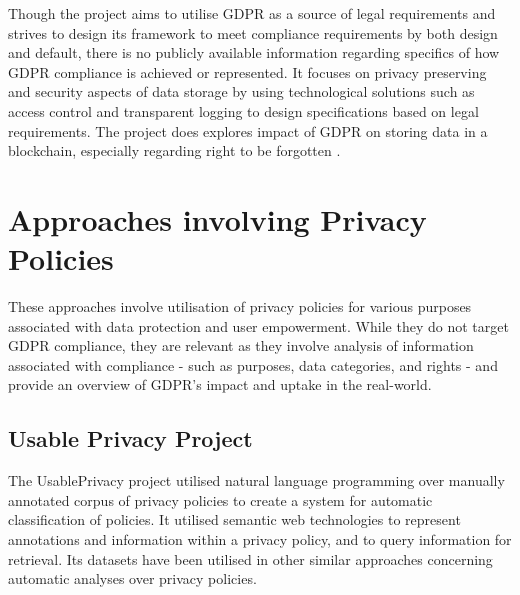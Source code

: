 Though the project aims to utilise GDPR as a source of legal requirements and strives to design its framework to meet compliance requirements by both design and default, there is no publicly available information regarding specifics of how GDPR compliance is achieved or represented.
It focuses on privacy preserving and security aspects of data storage by using technological solutions such as access control and transparent logging to design specifications based on legal requirements.
The project does explores impact of GDPR on storing data in a blockchain, especially regarding right to be forgotten \cite{bayle_when_2018}.

\section{Approaches involving Privacy Policies}\label{sec:sota:privacy-policies}
These approaches involve utilisation of privacy policies for various purposes associated with data protection and user empowerment. While they do not target GDPR compliance, they are relevant as they involve analysis of information associated with compliance - such as purposes, data categories, and rights - and provide an overview of GDPR's impact and uptake in the real-world.

\subsection*{Usable Privacy Project}
The UsablePrivacy project \cite{sadeh_usable_2013} utilised natural language programming over manually annotated corpus of privacy policies to create a system for automatic classification of policies. 
It utilised semantic web technologies \cite{oltramari_privonto_2018} to represent annotations and information within a privacy policy, and to query information for retrieval.
Its datasets have been utilised in other similar approaches \cite{harkous_polisis_2018,linden_privacy_2018} concerning automatic analyses over privacy policies. 

